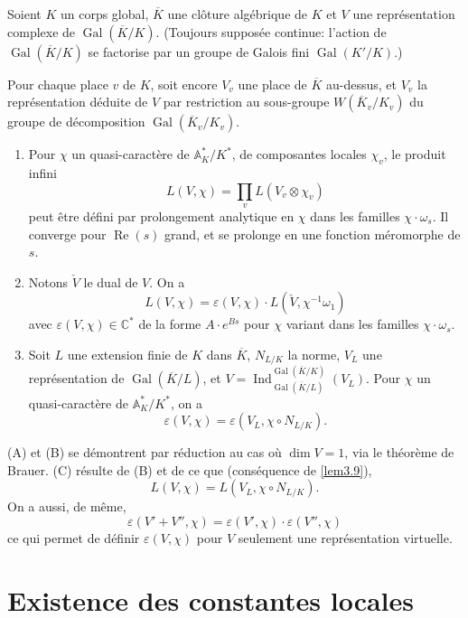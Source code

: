 \documentclass[11pt,a4paper]{amsart}
\theoremstyle{plain}
\theoremstyle{definition}
\DeclareMathOperator{\Ind}{Ind}
\DeclareMathOperator{\Gal}{Gal}
\newcommand{\dbC}{\mathbb{C}}
\newcommand{\dbA}{\mathbb{A}}
\DeclareMathOperator{\Ree}{Re}
\def\dim{\mathop{\mathrm{dim}}\nolimits}
\newcommand{\ov}[1]{\overline{#1}}
\newcommand{\eps}{\varepsilon}
\begin{document}
Soient $K$ un corps global, $\ov{K}$ une cl\^oture alg\'ebrique de $K$ et $V$ une repr\'esentation complexe de $\Gal(\ov{K}/K)$. (Toujours suppos\'ee continue: l'action de $\Gal(\ov{K}/K)$ se factorise par un groupe de Galois fini $\Gal(K'/K)$.)

Pour chaque place $v$ de $K$, soit encore $V_{v}$ une place de $\ov{K}$ au-dessus, et $V_{v}$ la repr\'esentation d\'eduite de $V$ par restriction au sous-groupe $W(\ov{K}_{v}/K_{v})$ du groupe de d\'ecomposition $\Gal(\ov{K}_{v}/K_{v})$.

\begin{enumerate}
\item[(A)] Pour $\chi$ un quasi-caract\`ere de $\dbA_{K}^{*}/K^{*}$, de composantes locales $\chi_{v}$, le produit infini
\[
L(V,\chi) = \prod_{v} L(V_{v} \otimes \chi_{v})
\]
peut \^etre d\'efini par prolongement analytique en $\chi$ dans les familles $\chi \cdot \omega_{s}$. Il converge pour $\Ree(s)$ grand, et se prolonge en une fonction m\'eromorphe de $s$.
\item[(B)] Notons $\check{V}$ le dual de $V$. On a
\begin{equation}
L(V,\chi) = \eps(V,\chi) \cdot L(\check{V},\chi^{-1}\omega_{1})
\end{equation}
avec $\eps(V,\chi) \in \dbC^{*}$ de la forme $A \cdot e^{Bs}$ pour $\chi$ variant dans les familles $\chi \cdot \omega_{s}$.
\item[(C)] Soit $L$ une extension finie de $K$ dans $\ov{K}$, $N_{L/K}$ la norme, $V_{L}$ une repr\'esentation de $\Gal(\ov{K}/L)$, et $V = \Ind_{\Gal(\ov{K}/L)}^{\Gal(\ov{K}/K)}(V_{L})$. Pour $\chi$ un quasi-caract\`ere de $\dbA_{K}^{*}/K^{*}$, on a
\[
\eps(V,\chi) = \eps(V_{L}, \chi \circ N_{L/K}).
\]
\end{enumerate}

(A) et (B) se d\'emontrent par r\'eduction au cas o\`u $\dim V = 1$, via le th\'eor\`eme de Brauer. (C) r\'esulte de (B) et de ce que (cons\'equence de \ref{lem3.9}),
\[
L(V,\chi) = L(V_{L}, \chi \circ N_{L/K}).
\]
On a aussi, de m\^eme,
\begin{equation}
\eps(V' + V'', \chi) = \eps(V',\chi) \cdot \eps(V'',\chi)
\end{equation}
ce qui permet de d\'efinir $\eps(V,\chi)$ pour $V$ seulement une repr\'esentation virtuelle.


\section{Existence des constantes locales}
\end{document}
